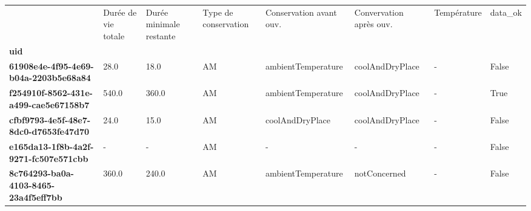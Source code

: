 \begin{tabularx}{\linewidth}{lXXXXXXX}
\toprule
{} &  Durée de vie totale &  Durée minimale restante & Type de conservation & Conservation avant ouv. & Convervation après ouv. & Température &  data\_ok \\
\textbf{uid                                 } &                      &                          &                      &                         &                         &             &          \\
\midrule
\textbf{61908e4e-4f95-4e69-b04a-2203b5e68a84} &                 28.0 &                     18.0 &                   AM &      ambientTemperature &         coolAndDryPlace &           - &    False \\
\textbf{f254910f-8562-431e-a499-cae5e67158b7} &                540.0 &                    360.0 &                   AM &      ambientTemperature &         coolAndDryPlace &           - &     True \\
\textbf{cfbf9793-4e5f-48e7-8dc0-d7653fe47d70} &                 24.0 &                     15.0 &                   AM &         coolAndDryPlace &         coolAndDryPlace &           - &    False \\
\textbf{e165da13-1f8b-4a2f-9271-fc507e571cbb} &                    - &                        - &                   AM &                       - &                       - &           - &    False \\
\textbf{8c764293-ba0a-4103-8465-23a4f5eff7bb} &                360.0 &                    240.0 &                   AM &      ambientTemperature &            notConcerned &           - &    False \\
\bottomrule
\end{tabularx}
